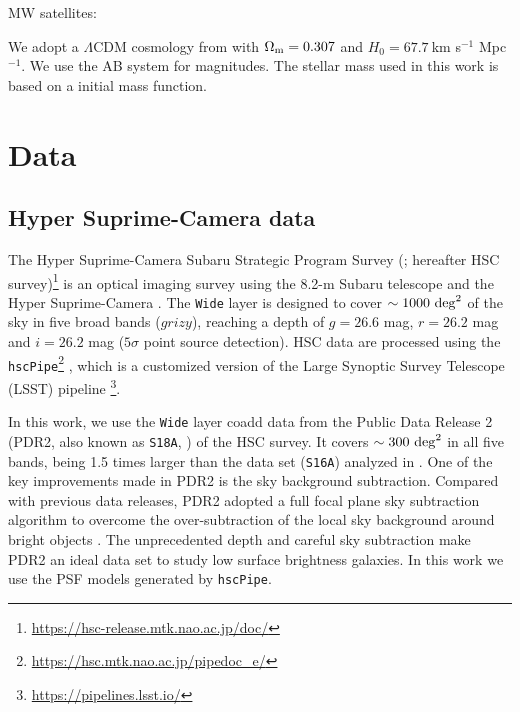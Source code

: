 \documentclass[twocolumn,astrosymb,twocolappendix]{aastex631}
\newcommand{\code}[1]{\texttt{#1}}
\begin{document}
\begin{CJK*}{UTF8}{gbsn}
MW satellites: \citep{Nashimoto2022}


We adopt a $\Lambda$CDM cosmology from \citet{Planck15} with $\Omega_{\rm m}= 0.307$ and $H_0 = 67.7\ $km s$^{-1}$ Mpc$^{-1}$. We use the AB system \citep{Oke1983} for magnitudes. The stellar mass used in this work is based on a \citet{Chabrier2003} initial mass function.

\section{Data} \label{sec:data}
\subsection{Hyper Suprime-Camera data}
The Hyper Suprime-Camera Subaru Strategic Program Survey (\citealt{Aihara2018}; hereafter HSC survey)\footnote{\url{https://hsc-release.mtk.nao.ac.jp/doc/}} is an optical imaging survey using the 8.2-m Subaru telescope and the Hyper Suprime-Camera \citep{Miyazaki2012, Miyazaki2018}. The \texttt{Wide} layer is designed to cover $\sim 1000\ \rm{deg}^{2}$ of the sky in five broad bands ($grizy$), reaching a depth of $g=26.6$ mag, $r=26.2$ mag and $i=26.2$ mag ($5\sigma$ point source detection). HSC data are processed using the \code{hscPipe}\footnote{\url{https://hsc.mtk.nao.ac.jp/pipedoc_e/}} \citep{Bosch2018}, which is a customized version of the Large Synoptic Survey Telescope (LSST) pipeline \citep{LSST-pipeline}\footnote{\url{https://pipelines.lsst.io/}}. 

In this work, we use the \code{Wide} layer coadd data from the Public Data Release 2 (PDR2, also known as \code{S18A}, \citealt{Aihara2018}) of the HSC survey. It covers $\sim 300\ \rm{deg}^2$ in all five bands, being 1.5 times larger than the data set (\code{S16A}) analyzed in \citet{Greco2018}. One of the key improvements made in PDR2 is the sky background subtraction. Compared with previous data releases, PDR2 adopted a full focal plane sky subtraction algorithm to overcome the over-subtraction of the local sky background around bright objects \citep{Aihara2018,Li2021}. The unprecedented depth and careful sky subtraction make PDR2 an ideal data set to study low surface brightness galaxies. In this work we use the PSF models generated by \code{hscPipe}. 



\end{CJK*}
\end{document}
